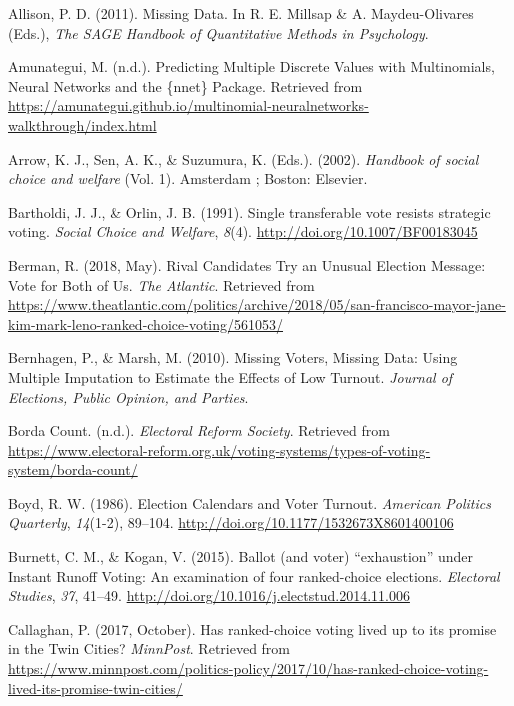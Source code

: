 \documentclass[12pt,twoside]{reedthesis}
\begin{document}
\leavevmode\hypertarget{ref-allison_missing_2011}{}%
Allison, P. D. (2011). Missing Data. In R. E. Millsap \& A. Maydeu-Olivares (Eds.), \emph{The SAGE Handbook of Quantitative Methods in Psychology}.

\leavevmode\hypertarget{ref-amunategui_predicting_nodate}{}%
Amunategui, M. (n.d.). Predicting Multiple Discrete Values with Multinomials, Neural Networks and the \{nnet\} Package. Retrieved from \url{https://amunategui.github.io/multinomial-neuralnetworks-walkthrough/index.html}

\leavevmode\hypertarget{ref-arrow_handbook_2002}{}%
Arrow, K. J., Sen, A. K., \& Suzumura, K. (Eds.). (2002). \emph{Handbook of social choice and welfare} (Vol. 1). Amsterdam ; Boston: Elsevier.

\leavevmode\hypertarget{ref-bartholdi_single_1991}{}%
Bartholdi, J. J., \& Orlin, J. B. (1991). Single transferable vote resists strategic voting. \emph{Social Choice and Welfare}, \emph{8}(4). \url{http://doi.org/10.1007/BF00183045}

\leavevmode\hypertarget{ref-berman_rival_2018}{}%
Berman, R. (2018, May). Rival Candidates Try an Unusual Election Message: Vote for Both of Us. \emph{The Atlantic}. Retrieved from \url{https://www.theatlantic.com/politics/archive/2018/05/san-francisco-mayor-jane-kim-mark-leno-ranked-choice-voting/561053/}

\leavevmode\hypertarget{ref-bernhagen_missing_2010}{}%
Bernhagen, P., \& Marsh, M. (2010). Missing Voters, Missing Data: Using Multiple Imputation to Estimate the Effects of Low Turnout. \emph{Journal of Elections, Public Opinion, and Parties}.

\leavevmode\hypertarget{ref-noauthor_borda_nodate}{}%
Borda Count. (n.d.). \emph{Electoral Reform Society}. Retrieved from \url{https://www.electoral-reform.org.uk/voting-systems/types-of-voting-system/borda-count/}

\leavevmode\hypertarget{ref-boyd_election_1986}{}%
Boyd, R. W. (1986). Election Calendars and Voter Turnout. \emph{American Politics Quarterly}, \emph{14}(1-2), 89--104. \url{http://doi.org/10.1177/1532673X8601400106}

\leavevmode\hypertarget{ref-burnett_ballot_2015}{}%
Burnett, C. M., \& Kogan, V. (2015). Ballot (and voter) ``exhaustion'' under Instant Runoff Voting: An examination of four ranked-choice elections. \emph{Electoral Studies}, \emph{37}, 41--49. \url{http://doi.org/10.1016/j.electstud.2014.11.006}

\leavevmode\hypertarget{ref-callaghan_has_2017}{}%
Callaghan, P. (2017, October). Has ranked-choice voting lived up to its promise in the Twin Cities? \emph{MinnPost}. Retrieved from \url{https://www.minnpost.com/politics-policy/2017/10/has-ranked-choice-voting-lived-its-promise-twin-cities/}
\end{document}
